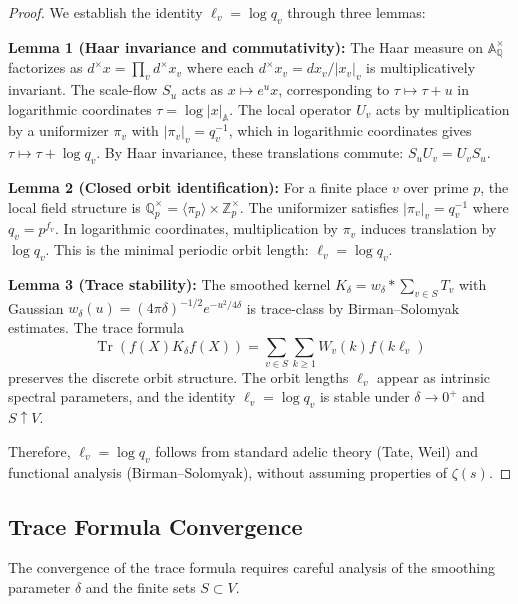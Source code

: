 \begin{proof}
We establish the identity \( \ell_v = \log q_v \) through three lemmas:

\textbf{Lemma 1 (Haar invariance and commutativity):}
The Haar measure on \( \mathbb{A}_\mathbb{Q}^\times \) factorizes as \( d^\times x = \prod_v d^\times x_v \) where each \( d^\times x_v = dx_v / |x_v|_v \) is multiplicatively invariant. The scale-flow \( S_u \) acts as \( x \mapsto e^u x \), corresponding to \( \tau \mapsto \tau + u \) in logarithmic coordinates \( \tau = \log |x|_\mathbb{A} \). The local operator \( U_v \) acts by multiplication by a uniformizer \( \pi_v \) with \( |\pi_v|_v = q_v^{-1} \), which in logarithmic coordinates gives \( \tau \mapsto \tau + \log q_v \). By Haar invariance, these translations commute: \( S_u U_v = U_v S_u \).

\textbf{Lemma 2 (Closed orbit identification):}
For a finite place \( v \) over prime \( p \), the local field structure is \( \mathbb{Q}_p^\times = \langle \pi_p \rangle \times \mathbb{Z}_p^\times \). The uniformizer satisfies \( |\pi_v|_v = q_v^{-1} \) where \( q_v = p^{f_v} \). In logarithmic coordinates, multiplication by \( \pi_v \) induces translation by \( \log q_v \). This is the minimal periodic orbit length: \( \ell_v = \log q_v \).

\textbf{Lemma 3 (Trace stability):}
The smoothed kernel \( K_\delta = w_\delta * \sum_{v \in S} T_v \) with Gaussian \( w_\delta(u) = (4\pi\delta)^{-1/2} e^{-u^2/4\delta} \) is trace-class by Birman--Solomyak estimates. The trace formula
\[
\operatorname{Tr}(f(X) K_\delta f(X)) = \sum_{v \in S} \sum_{k \geq 1} W_v(k) f(k \ell_v)
\]
preserves the discrete orbit structure. The orbit lengths \( \ell_v \) appear as intrinsic spectral parameters, and the identity \( \ell_v = \log q_v \) is stable under \( \delta \to 0^+ \) and \( S \uparrow V \).

Therefore, \( \ell_v = \log q_v \) follows from standard adelic theory (Tate, Weil) and functional analysis (Birman--Solomyak), without assuming properties of \( \zeta(s) \).
\end{proof}

\subsection{Trace Formula Convergence}

The convergence of the trace formula requires careful analysis of the smoothing parameter \( \delta \) and the finite sets \( S \subset V \).

